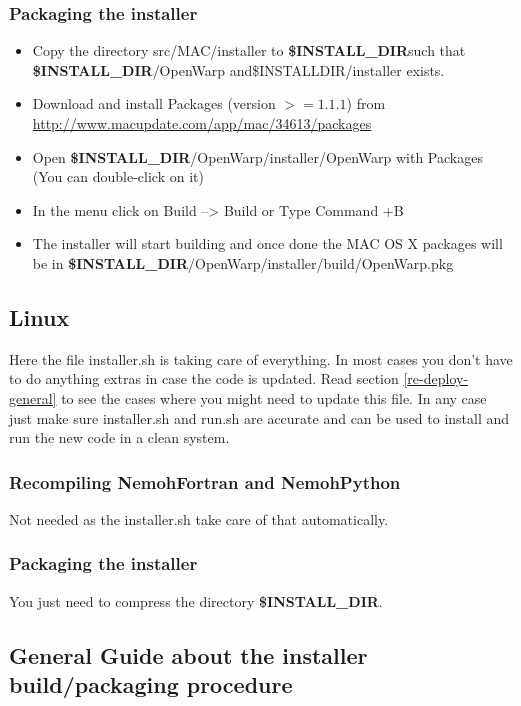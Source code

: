 \documentclass[12pt]{article}
\newcommand{\INSTALLDIR}{{\textbf{\$INSTALL{\_}DIR}}}
\begin{document}
\subsubsection{Packaging the installer}

\begin{itemize}
	\item Copy the directory src/MAC/installer to \INSTALLDIR such that \INSTALLDIR/OpenWarp and\$INSTALLDIR/installer exists.
\item Download and install Packages (version $>= 1.1.1$) from \url{http://www.macupdate.com/app/mac/34613/packages}
\item Open \INSTALLDIR/OpenWarp/installer/OpenWarp with Packages (You can double-click on it)
\item In the menu click on Build --> Build or Type Command +B
\item The installer will start building and once done the MAC OS X packages will be in \INSTALLDIR/OpenWarp/installer/build/OpenWarp.pkg
\end{itemize}

\subsection{Linux}

Here the file installer.sh is taking care of everything. In most cases you don't have to do anything extras in case the code is updated. Read section \ref{re-deploy-general} to see the cases where you might need to update this file. In any case just make sure installer.sh and run.sh are accurate and can be used to install and run the new code in a clean system.

\subsubsection{Recompiling NemohFortran and NemohPython}
Not needed as the installer.sh take care of that automatically.
\subsubsection{Packaging the installer}
You just need to compress the directory \INSTALLDIR.

\subsection{General Guide about the installer build/packaging procedure}
\end{document}
